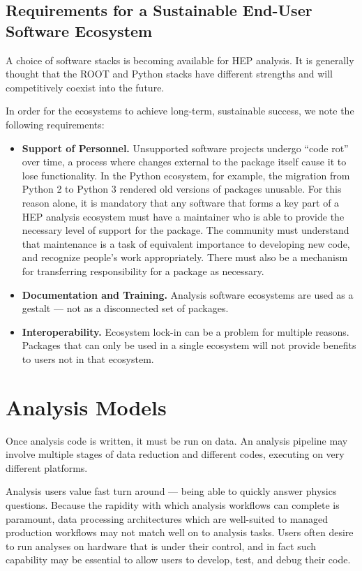 \subsection{Requirements for a Sustainable End-User Software Ecosystem}
A choice of software stacks is becoming available for HEP analysis. It is generally thought that the ROOT and Python stacks have different strengths and will competitively coexist into the future.

In order for the ecosystems to achieve long-term, sustainable success, we note the following requirements:
\begin{itemize}
    \item \textbf{Support of Personnel.} Unsupported software projects undergo ``code rot'' over time, a process where changes external to the package itself cause it to lose functionality. In the Python ecosystem, for example, the migration from Python 2 to Python 3 rendered old versions of packages unusable. For this reason alone, it is mandatory that any software that forms a key part of a HEP analysis ecosystem must have a maintainer who is able to provide the necessary level of support for the package. The community must understand that maintenance is a task of equivalent importance to developing new code, and recognize people's work appropriately. There must also be a mechanism for transferring responsibility for a package as necessary.
    \item \textbf{Documentation and Training.} Analysis software ecosystems are used as a gestalt --- not as a disconnected set of packages. 
    \item \textbf{Interoperability.} Ecosystem lock-in can be a problem for multiple reasons. Packages that can only be used in a single ecosystem will not provide benefits to users not in that ecosystem. 
\end{itemize}

\section{Analysis Models}
Once analysis code is written, it must be run on data. An analysis pipeline may involve multiple stages of data reduction and different codes, executing on very different platforms.

Analysis users value fast turn around --- being able to quickly answer physics questions. Because the rapidity with which analysis workflows can complete is paramount, data processing architectures which are well-suited to managed production workflows may not match well on to analysis tasks. Users often desire to run analyses on hardware that is under their control, and in fact such capability may be essential to allow users to develop, test, and debug their code. 

